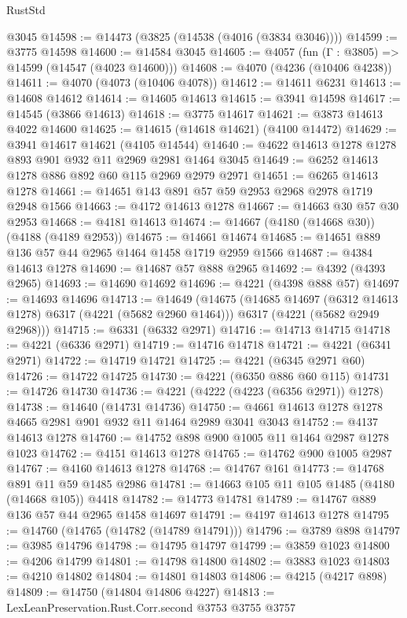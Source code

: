 \begin{lexlean}{RustStd}
\begin{coremodule}
{\begin{coremodule}
{{{{{{{{{{{{{{{{{{{{{{{{{{{{{{{    @3045
@14598 := @14473 (@3825 (@14538 (@4016 (@3834 @3046))))
@14599 := @3775 @14598
@14600 := @14584 @3045
@14605 := @4057 (fun (Γ : @3805) => @14599 (@14547 (@4023 @14600)))
@14608 := @4070 (@4236 (@10406 @4238))
@14611 := @4070 (@4073 (@10406 @4078))
@14612 := @14611 @6231
@14613 := @14608 @14612
@14614 := @14605 @14613
@14615 := @3941 @14598
@14617 := @14545 (@3866 @14613)
@14618 := @3775 @14617
@14621 := @3873 @14613 @4022 @14600
@14625 := @14615 (@14618 @14621) (@4100 @14472)
@14629 := @3941 @14617 @14621 (@4105 @14544)
@14640 := @4622 @14613 @1278 @1278 @893 @901 @932 @11 @2969 @2981 @1464 @3045
@14649 := @6252 @14613 @1278 @886 @892 @60 @115 @2969 @2979 @2971
@14651 := @6265 @14613 @1278
@14661 := @14651 @143 @891 @57 @59 @2953 @2968 @2978 @1719 @2948 @1566
@14663 := @4172 @14613 @1278
@14667 := @14663 @30 @57 @30 @2953
@14668 := @4181 @14613
@14674 := @14667 (@4180 (@14668 @30)) (@4188 (@4189 @2953))
@14675 := @14661 @14674
@14685 := @14651 @889 @136 @57 @44 @2965 @1464 @1458 @1719 @2959 @1566
@14687 := @4384 @14613 @1278
@14690 := @14687 @57 @888 @2965
@14692 := @4392 (@4393 @2965)
@14693 := @14690 @14692
@14696 := @4221 (@4398 @888 @57)
@14697 := @14693 @14696
@14713 := @14649
    (@14675
      (@14685 @14697 (@6312 @14613 @1278) @6317 (@4221 (@5682 @2960 @1464)))
      @6317
      (@4221 (@5682 @2949 @2968)))
@14715 := @6331 (@6332 @2971)
@14716 := @14713 @14715
@14718 := @4221 (@6336 @2971)
@14719 := @14716 @14718
@14721 := @4221 (@6341 @2971)
@14722 := @14719 @14721
@14725 := @4221 (@6345 @2971 @60)
@14726 := @14722 @14725
@14730 := @4221 (@6350 @886 @60 @115)
@14731 := @14726 @14730
@14736 := @4221 (@4222 (@4223 (@6356 @2971)) @1278)
@14738 := @14640 (@14731 @14736)
@14750 := @4661 @14613 @1278 @1278 @4665 @2981 @901 @932 @11 @1464 @2989 @3041 @3043
@14752 := @4137 @14613 @1278
@14760 := @14752 @898 @900 @1005 @11 @1464 @2987 @1278 @1023
@14762 := @4151 @14613 @1278
@14765 := @14762 @900 @1005 @2987
@14767 := @4160 @14613 @1278
@14768 := @14767 @161
@14773 := @14768 @891 @11 @59 @1485 @2986
@14781 := @14663 @105 @11 @105 @1485 (@4180 (@14668 @105)) @4418
@14782 := @14773 @14781
@14789 := @14767 @889 @136 @57 @44 @2965 @1458 @14697
@14791 := @4197 @14613 @1278
@14795 := @14760 (@14765 (@14782 (@14789 @14791)))
@14796 := @3789 @898
@14797 := @3985 @14796
@14798 := @14795 @14797
@14799 := @3859 @1023
@14800 := @4206 @14799
@14801 := @14798 @14800
@14802 := @3883 @1023
@14803 := @4210 @14802
@14804 := @14801 @14803
@14806 := @4215 (@4217 @898)
@14809 := @14750 (@14804 @14806 @4227)
@14813 := LexLeanPreservation.Rust.Corr.second @3753 @3755 @3757
}}}}}}}}}}}}}}}}}}}}}}}}}}}}}}}
\end{coremodule}}
\end{coremodule}
\end{lexlean}
